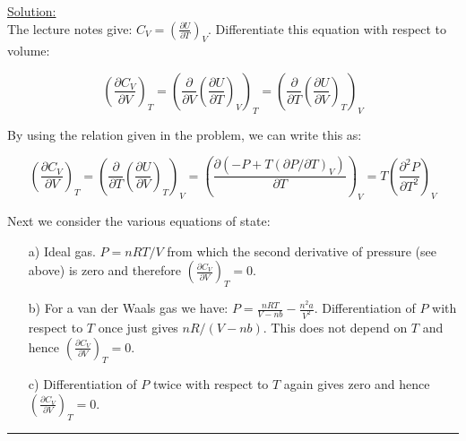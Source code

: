 \noindent
\underline{Solution:}\\

The lecture notes give: $C_V = \left(\frac{\partial U}{\partial T}\right)_V$. Differentiate this equation with respect to volume:

$$\left(\frac{\partial C_V}{\partial V}\right)_T = \left(\frac{\partial}{\partial V}\left(\frac{\partial U}{\partial T}\right)_V\right)_T = \left(\frac{\partial}{\partial T}\left(\frac{\partial U}{\partial V}\right)_T\right)_V$$

By using the relation given in the problem, we can write this as:

$$\left(\frac{\partial C_V}{\partial V}\right)_T = \left(\frac{\partial}{\partial T}\left(\frac{\partial U}{\partial V}\right)_T\right)_V = \left(\frac{\partial\left(-P + T\left(\partial P / \partial T\right)_V\right)}{\partial T}\right)_V = T\left(\frac{\partial^2 P}{\partial T^2}\right)_V$$

Next we consider the various equations of state:

\begin{itemize}
\item[a)] Ideal gas. $P = nRT / V$ from which the second derivative of pressure (see above) is zero and therefore $\left(\frac{\partial C_V}{\partial V}\right)_T = 0$.

\item[b)] For a van der Waals gas we have: $P = \frac{nRT}{V - nb} - \frac{n^2a}{V^2}$. Differentiation of $P$ with respect to $T$ once just gives $nR / (V - nb)$. This does not depend on $T$ and hence $\left(\frac{\partial C_V}{\partial V}\right)_T = 0$.

\item[c)] Differentiation of $P$ twice with respect to $T$ again gives zero and hence $\left(\frac{\partial C_V}{\partial V}\right)_T = 0$.
\end{itemize}

\hrule\vspace{0.5cm}
